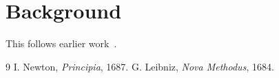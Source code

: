 \documentclass{article}
\begin{document}
\section{Background}
This follows earlier work~\cite{newton,leibniz}.
\begin{thebibliography}{9}
 I. Newton, \emph{Principia}, 1687.
 G. Leibniz, \emph{Nova Methodus}, 1684.
\end{thebibliography}
\end{document}
